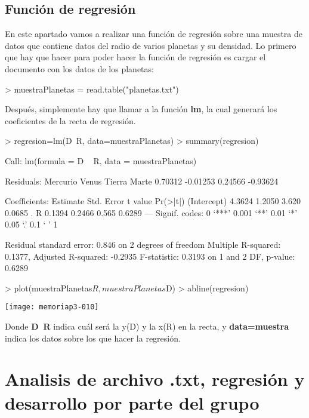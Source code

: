\documentclass [a4paper] {article}
\begin{document}
\subsection{Función de regresión}
En este apartado vamos a realizar una función de regresión sobre una muestra de datos que contiene datos del radio de varios planetas 
y su densidad. 
Lo primero que hay que hacer para poder hacer la función de regresión es cargar el documento con los datos de los planetas: 

\begin{Schunk}
\begin{Sinput}
> muestraPlanetas = read.table("planetas.txt")
\end{Sinput}
\end{Schunk}

Después, simplemente hay que llamar a la función \textbf{lm}, la cual generará los coeficientes de la recta de regresión. 

\begin{Schunk}
\begin{Sinput}
> regresion=lm(D~R, data=muestraPlanetas)
> summary(regresion)
\end{Sinput}
\begin{Soutput}
Call:
lm(formula = D ~ R, data = muestraPlanetas)

Residuals:
Mercurio    Venus   Tierra    Marte 
 0.70312 -0.01253  0.24566 -0.93624 

Coefficients:
            Estimate Std. Error t value Pr(>|t|)  
(Intercept)   4.3624     1.2050   3.620   0.0685 .
R             0.1394     0.2466   0.565   0.6289  
---
Signif. codes:  0 ‘***’ 0.001 ‘**’ 0.01 ‘*’ 0.05 ‘.’ 0.1 ‘ ’ 1

Residual standard error: 0.846 on 2 degrees of freedom
Multiple R-squared:  0.1377,	Adjusted R-squared:  -0.2935 
F-statistic: 0.3193 on 1 and 2 DF,  p-value: 0.6289
\end{Soutput}
\end{Schunk}
\begin{Schunk}
\begin{Sinput}
> plot(muestraPlanetas$R, muestraPlanetas$D)
> abline(regresion)
\end{Sinput}
\end{Schunk}
\texttt{[image: memoriap3-010]}


Donde \textbf{D~R} indica cuál será la y(D) y la x(R) en la recta, y \textbf{data=muestra} indica los datos sobre los que hacer la regresión.

\section{Analisis de archivo .txt, regresión y desarrollo por parte del grupo}
\end{document}
